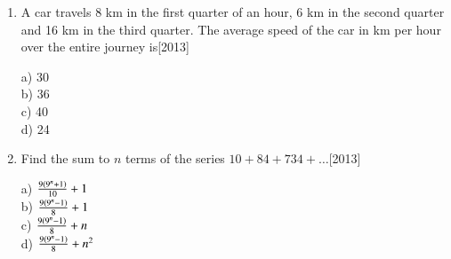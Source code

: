 \documentclass[journal]{IEEEtran}
\begin{document}
\begin{enumerate}[start=53]
\item A car travels 8 km in the first quarter of an hour, 6 km in the second quarter and 16 km in the third quarter. The average speed of the car in km per hour over the entire journey is\hfill{[2013]}
\begin{multicols}{4}
    a) 30\\
    b) 36\\
    c) 40\\
    d) 24
\end{multicols}
\item Find the sum to $n$ terms of the series $10+84+734+\dots$\hfill{[2013]}
\begin{multicols}{4}
     a) $\frac{9\left(9^n+1\right)}{10}+1$\\
     b) $\frac{9\left(9^n-1\right)}{8}+1$\\
     c) $\frac{9\left(9^n-1\right)}{8}+n$\\
     d) $\frac{9\left(9^n-1\right)}{8}+n^2$
 \end{multicols}
 
\end{enumerate}
\end{document}
